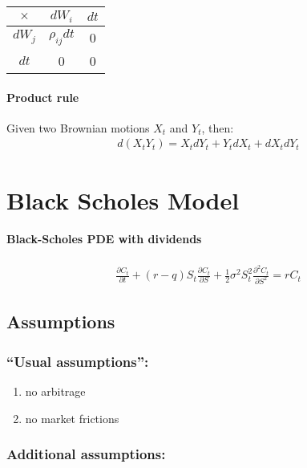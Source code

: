 \documentclass[a4paper, DIV19,12pt]{scrartcl}
\newcommand{\bparens}  [1]{\left(       #1 \right)      } %
\begin{document}
\begin{tabular}{|c| c c|}
\hline
  $\times$ & $dW_i$ & $dt$  \\
  \hline
  $dW_j$ & $\rho_{ij}dt$ & 0 \\
  $dt$ & 0 & 0 \\
  \hline
\end{tabular}

\paragraph{Product rule}

Given two Brownian motions $X_t$ and $Y_t$, then:
\begin{eqnarray}
d\bparens{X_tY_t} = X_t dY_t + Y_t dX_t + dX_t dY_t
\end{eqnarray}

\section{Black Scholes Model}

\paragraph{Black-Scholes PDE with dividends}

\begin{eqnarray}
\frac{\partial C_t}{\partial{t}} + \bparens{r - q} S_t \frac{\partial C_t}{\partial S} + \frac{1}{2} \sigma^2 S_t^2 \frac{\partial^2 C_t}{\partial S^2} = rC_t
\end{eqnarray}

\subsection{Assumptions}

\subsubsection{``Usual assumptions'':}

\begin{enumerate}
\item no arbitrage
\item no market frictions
\end{enumerate}

\subsubsection{Additional assumptions:}
\end{document}

